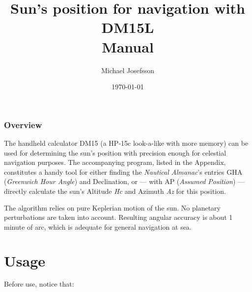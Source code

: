 \documentclass[swedish,a4paper,onepage, 11pt]{scrbook}
\begin{document}
\newcommand{\tavla}[1]{\reversemarginpar{ \rule[-10mm]{0.1mm}{#1cm}}}
\newcommand{\svarsrad}{\begin{flushright} \rule{7cm}{0.2mm} \end{flushright}}
\newcommand{\asm}[1]{\texttt{\textbf{#1}}}

\newcommand{\startex}[1]{\textbf{Example}\begin{quote}#1\end{quote}}
\newcommand{\slutex}{\begin{flushright}\rule{1ex}{1ex}\end{flushright}}


\title{Sun's position for navigation with DM15L\\{}Manual\\{}}

\author{Michael Josefsson}
\date{\today}
\maketitle

\addtolength{\evensidemargin}{-2.0cm}
\addtolength{\oddsidemargin}{2.0cm}

\subsection*{Overview}

The handheld calculator DM15 (a HP-15c look-a-like with more memory) can be used for determining the sun's position with precision enough for celestial navigation purposes. The accompanying program, listed in the Appendix, constitutes a handy tool for either finding the \emph{Nautical Almanac}'s entries GHA (\emph{Greenwich Hour Angle}) and Declination, or --- with AP (\emph{Assumed Position}) --- directly calculate the sun's Altitude \emph{Hc} and Azimuth \emph{Az} for this position.

The algorithm relies on pure Keplerian motion of the sun. No planetary perturbations are taken into account. Resulting angular accuracy is about 1 minute of arc, which is adequate for general navigation at sea.

\chapter{Usage} 

Before use, notice that: 
\end{document}
